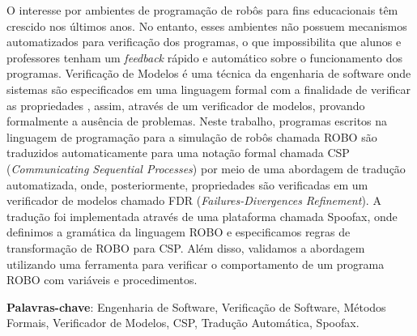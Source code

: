 \setlength{\absparsep}{18pt} %
\begin{resumo}
 
O interesse por ambientes de programação de robôs para fins educacionais têm crescido nos últimos anos. No entanto, esses ambientes não possuem mecanismos automatizados para verificação dos programas, o que impossibilita que alunos e professores tenham um \textit{feedback} rápido e automático sobre o funcionamento dos programas. 
Verificação de Modelos é uma técnica da engenharia de software onde sistemas são especificados em uma linguagem formal com a finalidade de verificar as propriedades , assim, através de um verificador de modelos, provando formalmente a ausência de problemas. 
Neste trabalho, programas escritos na linguagem de programação para a simulação de robôs chamada ROBO são traduzidos automaticamente para uma notação formal chamada CSP (\textit{Communicating Sequential Processes}) por meio de uma abordagem de tradução automatizada, onde, posteriormente, propriedades são verificadas em um verificador de modelos chamado FDR (\textit{Failures-Divergences Refinement}). A tradução foi implementada através de uma plataforma chamada Spoofax, onde definimos a gramática da linguagem ROBO e especificamos regras de transformação de ROBO para CSP. Além disso, validamos a abordagem utilizando uma ferramenta para verificar o comportamento de um programa ROBO com variáveis e procedimentos. %

 \textbf{Palavras-chave}: Engenharia de Software, Verificação de Software, Métodos Formais, Verificador de Modelos, CSP, Tradução Automática, Spoofax.
\end{resumo}

